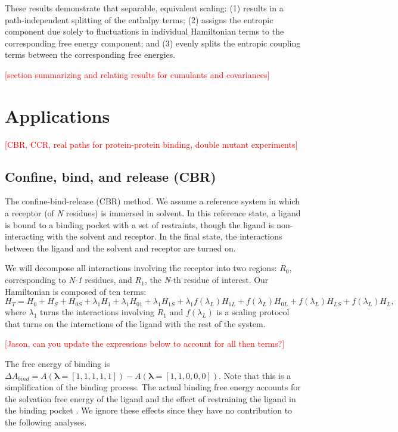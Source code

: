 \documentclass[%
 preprint,
 amsmath,amssymb,
 aps,
]{revtex4-1}
\newcommand{\warning}[1]{{\textsf{{\textcolor{red}{{[#1]}{}}}}}}
\renewcommand{\vec}[1]{{\mathbf{#1}}}
\begin{document}
These results demonstrate that separable, equivalent scaling: (1) results in a path-independent splitting of the enthalpy terms; (2) assigns the entropic component due solely to fluctuations in individual Hamiltonian terms to the corresponding free energy component; and (3) evenly splits the entropic coupling terms between the corresponding free energies.

\warning{section summarizing and relating results for cumulants and covariances}

\section{Applications}
\warning{CBR, CCR, real paths for protein-protein binding, double mutant experiments}

\subsection{Confine, bind, and release (CBR)}

The confine-bind-release (CBR) method.\cite{NULL}  We assume a reference system in which a receptor (of \emph{N} residues) is immersed in solvent. In this reference state, a ligand is bound to a binding pocket with a set of restraints, though the ligand is non-interacting with the solvent and receptor. In the final state, the interactions between the ligand and the solvent and receptor are turned on.

We will decompose all interactions involving the receptor into two regions: $R_0$, corresponding to \emph{N-1} residues, and $R_1$, the \emph{N}-th residue of interest. Our Hamiltonian is composed of ten terms:
\begin{equation}
H_T = 
H_0 + H_S + H_{0S} + 
\lambda_1H_1 + \lambda_1H_{01} + \lambda_1H_{1S} +
\lambda_1f(\lambda_L)H_{1L} + f(\lambda_L)H_{0L} +
f(\lambda_L)H_{LS} + f(\lambda_L)H_L,
\end{equation}
where $\lambda_1$ turns the interactions involving $R_1$ and $f(\lambda_L)$ is a scaling protocol that turns on the interactions of the ligand with the rest of the system.

\warning{Jason, can you update the expressions below to account for all then terms?}

The free energy of binding is 
$\Delta A_{bind} = A\left(\vec{\lambda}=\left[1,1,1,1,1\right] \right) - 
A\left( \vec{\lambda} = \left[ 1,1,0,0,0 \right]   \right)$. 
Note that this is a simplification of the binding process.  The actual binding free energy accounts for the solvation free energy of the ligand and the effect of restraining the ligand in the binding pocket \cite{NULL}.  We ignore these effects
since they have no contribution to the following analyses. 
\end{document}
